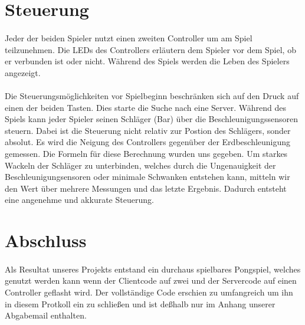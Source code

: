 \section*{Steuerung}

\paragraph*{}
Jeder der beiden Spieler nutzt einen zweiten Controller um am Spiel teilzunehmen. Die LEDs des Controllers erläutern dem Spieler vor dem Spiel, ob er verbunden ist oder nicht. Während des Spiels werden die Leben des Spielers angezeigt. 

\paragraph*{}
Die Steuerungsmöglichkeiten vor Spielbeginn beschränken sich auf den Druck auf einen der beiden Tasten. Dies starte die Suche nach eine Server. Während des Spiels kann jeder Spieler seinen Schläger (Bar) über die Beschleunigungssensoren steuern. Dabei ist die Steuerung nicht relativ zur Postion des Schlägers, sonder absolut. Es wird die Neigung des Controllers gegenüber der Erdbeschleunigung gemessen. Die Formeln für diese Berechnung wurden uns gegeben. Um starkes Wackeln der Schläger zu unterbinden, welches durch die Ungenauigkeit der Beschleunigungsensoren oder minimale Schwanken entstehen kann, mitteln wir den Wert über mehrere Messungen und das letzte Ergebnis. Dadurch entsteht eine angenehme und akkurate Steuerung.

\section*{Abschluss}

\paragraph*{}
Als Resultat unseres Projekts entstand ein durchaus spielbares Pongspiel, welches genutzt werden kann wenn der Clientcode auf zwei und der Servercode auf einen Controller geflasht wird. Der vollständige Code erschien zu umfangreich um ihn in diesem Protkoll ein zu schließen und ist deßhalb nur im Anhang unserer Abgabemail enthalten.


